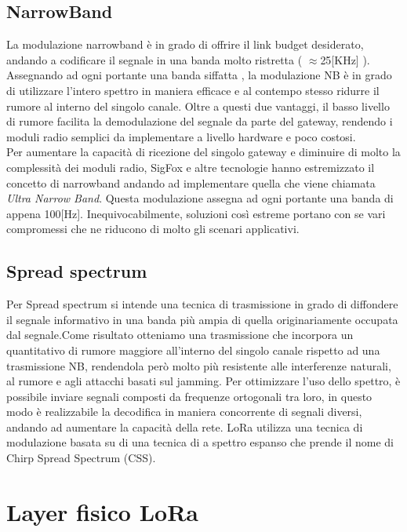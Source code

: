 \subsection{NarrowBand}
La modulazione narrowband è in grado di offrire il link budget desiderato,
andando a codificare il segnale in una banda molto ristretta ( $\approx$25[KHz]
).  Assegnando ad ogni  portante una banda siffatta , la modulazione NB è in
grado di utilizzare l'intero spettro in maniera efficace e al contempo stesso
ridurre il rumore al interno del singolo canale. Oltre a questi due vantaggi, il basso
livello di rumore facilita la demodulazione del segnale da parte del gateway, rendendo i
moduli radio semplici da implementare a livello hardware e poco costosi.\\
Per aumentare la capacità di ricezione
del  singolo gateway  e diminuire di molto la  complessità dei moduli radio,
SigFox e altre tecnologie hanno estremizzato il concetto di narrowband andando ad
implementare quella che viene chiamata \emph{Ultra Narrow Band}.
Questa modulazione assegna ad ogni portante una banda di appena 100[Hz]. 
Inequivocabilmente, soluzioni così estreme portano con se vari  compromessi che
ne riducono di molto gli scenari applicativi.

\subsection{Spread spectrum} 
Per  Spread spectrum si intende una tecnica di trasmissione
in grado di diffondere il segnale informativo in una banda più ampia di quella
originariamente occupata dal segnale.Come risultato otteniamo una trasmissione 
che incorpora un quantitativo di  rumore maggiore all'interno del singolo canale
rispetto ad una trasmissione NB,
rendendola però molto più resistente alle interferenze
naturali, al rumore e agli attacchi basati sul jamming.
Per ottimizzare l'uso dello spettro, è possibile inviare segnali composti da  
frequenze ortogonali tra loro, in questo modo è realizzabile la decodifica in maniera
concorrente di segnali diversi, andando ad aumentare la capacità della rete.
LoRa utilizza una tecnica di modulazione basata su di una tecnica di a 
spettro espanso che prende il nome di Chirp Spread Spectrum (CSS).
\section{Layer fisico LoRa}
